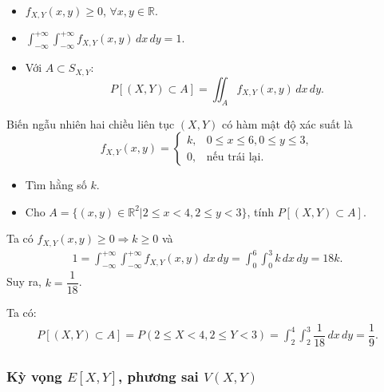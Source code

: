 \documentclass[12pt,a4paper]{article}
\begin{document}
\begin{tinhchat}
  \begin{itemize}
    \item $f_{X,Y}(x, y) \ge 0$, $\forall x, y \in \mathbb{R}$.
    \item $\displaystyle\int_{-\infty}^{+\infty} \displaystyle\int_{-\infty}^{+\infty} f_{X,Y}(x, y)\,dx\,dy = 1$.
    \item Với $A \subset S_{X,Y}$:
    \[
      P[(X, Y) \subset A] = \displaystyle\iint_A f_{X,Y}(x, y)\,dx\,dy.
    \]
  \end{itemize}
\end{tinhchat}

\begin{vidu}
Biến ngẫu nhiên hai chiều liên tục $(X, Y)$ có hàm mật độ xác suất là
  \[
    f_{X,Y}(x, y) = \begin{cases}
      k, & 0 \le x \le 6, 0 \le y \le 3, \\
      0, & \text{nếu trái lại}.
    \end{cases}
  \]
  \begin{itemize}
    \item Tìm hằng số $k$.
    \item Cho $A = \{(x, y) \in \mathbb{R}^2 | 2 \le x < 4, 2 \le y < 3\}$, tính $P[(X, Y ) \subset A]$.
  \end{itemize}
  Ta có $f_{X,Y}(x, y) \ge 0 \Rightarrow k \ge 0$ và
  \begin{align*}
    1 = \displaystyle\int_{-\infty}^{+\infty} \displaystyle\int_{-\infty}^{+\infty} f_{X,Y}(x, y)\,dx\,dy = \displaystyle\int_{0}^{6} \displaystyle\int_{0}^{3} k\,dx\,dy = 18k.
  \end{align*}
  Suy ra, $k = \dfrac{1}{18}$.

  Ta có:
  \begin{align*}
    P[(X, Y) \subset A] = P(2 \le X < 4, 2 \le Y < 3) = \displaystyle\int_{2}^{4} \displaystyle\int_{2}^{3} \dfrac{1}{18}\,dx\,dy = \dfrac{1}{9}.
  \end{align*}
\end{vidu}

\subsubsection{Kỳ vọng $E[X,Y]$, phương sai $V(X,Y)$}
\end{document}
